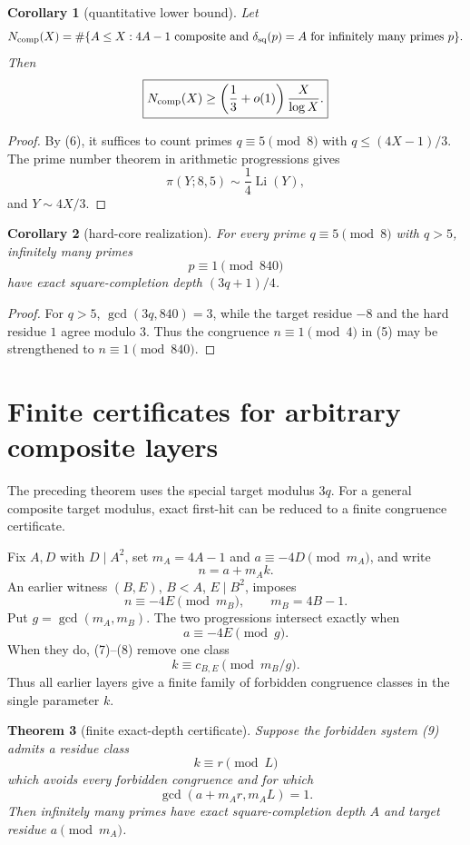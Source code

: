 \documentclass[11pt]{article}
\newtheorem{theorem}{Theorem}
\newtheorem{corollary}[theorem]{Corollary}
\theoremstyle{definition}
\begin{document}
\begin{corollary}[quantitative lower bound]\label{cor:count}
Let
\[
N_{\rm comp}(X)=\#\{A\le X:4A-1\text{ composite and }\delta_{\rm sq}(p)=A\text{ for infinitely many primes }p\}.
\]
Then
\[
\boxed{
N_{\rm comp}(X)\ge
\left(\frac13+o(1)\right)\frac{X}{\log X}.
}
\]
\end{corollary}

\begin{proof}
By (6), it suffices to count primes $q\equiv5\pmod8$ with $q\le(4X-1)/3$.  The prime number theorem in arithmetic progressions gives
\[
\pi(Y;8,5)\sim\frac14\operatorname{Li}(Y),
\]
and $Y\sim4X/3$.
\end{proof}

\begin{corollary}[hard-core realization]
For every prime $q\equiv5\pmod8$ with $q>5$, infinitely many primes
\[
p\equiv1\pmod{840}
\]
have exact square-completion depth $(3q+1)/4$.
\end{corollary}

\begin{proof}
For $q>5$, $\gcd(3q,840)=3$, while the target residue $-8$ and the hard residue $1$ agree modulo $3$.  Thus the congruence $n\equiv1\pmod4$ in (5) may be strengthened to $n\equiv1\pmod{840}$.
\end{proof}

\section{Finite certificates for arbitrary composite layers}
The preceding theorem uses the special target modulus $3q$.  For a general composite target modulus, exact first-hit can be reduced to a finite congruence certificate.

Fix $A,D$ with $D\mid A^2$, set $m_A=4A-1$ and $a\equiv-4D\pmod{m_A}$, and write
\[
n=a+m_Ak. \tag{7}
\]
An earlier witness $(B,E)$, $B<A$, $E\mid B^2$, imposes
\[
n\equiv-4E\pmod{m_B},
\qquad m_B=4B-1. \tag{8}
\]
Put $g=\gcd(m_A,m_B)$.  The two progressions intersect exactly when
\[
a\equiv-4E\pmod g.
\]
When they do, (7)--(8) remove one class
\[
k\equiv c_{B,E}\pmod{m_B/g}. \tag{9}
\]
Thus all earlier layers give a finite family of forbidden congruence classes in the single parameter $k$.

\begin{theorem}[finite exact-depth certificate]
Suppose the forbidden system (9) admits a residue class
\[
k\equiv r\pmod L
\]
which avoids every forbidden congruence and for which
\[
\gcd(a+m_Ar,m_AL)=1.
\]
Then infinitely many primes have exact square-completion depth $A$ and target residue $a\pmod{m_A}$.
\end{theorem}
\end{document}
